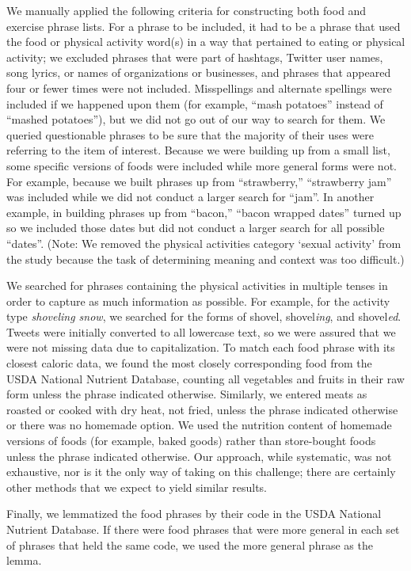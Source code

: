 \documentclass[10pt]{article}
\begin{document}
We manually applied the following criteria for constructing both food and exercise
phrase lists.
For a phrase to be included, it had to be a phrase that used the food
or physical activity word(s) in a way that pertained to eating or
physical activity; we excluded phrases that were part of hashtags,
Twitter user names, song lyrics, or names of organizations or
businesses, and phrases that appeared four or fewer times were not
included.
Misspellings and alternate spellings were included if we happened upon
them (for example, ``mash potatoes'' instead of ``mashed potatoes''),
but we did not go out of our way to search for them.
We queried questionable phrases to be sure that the majority of their
uses were referring to the item of interest.
Because we were building up from a small list, some specific versions
of foods were included while more general forms were not.  For
example, because we built phrases up from ``strawberry,'' ``strawberry
jam'' was included while we did not conduct a larger search for ``jam''.
In another example, in building phrases up from ``bacon,'' ``bacon
wrapped dates'' turned up so we included those dates but did not
conduct a larger search for all possible ``dates''.
(Note: We removed the physical activities category `sexual activity'
from the study because the task of determining meaning and context was
too difficult.)

We searched for phrases containing the physical activities in multiple
tenses in order to capture as much information as possible.
For example, for the activity type \textit{shoveling snow}, we
searched for the forms of shovel, shovel\textit{ing}, and
shovel\textit{ed}.
Tweets were initially converted to all lowercase text, so we were
assured that we were not missing data due to capitalization.
To match each food phrase with its closest caloric data, we found the
most closely corresponding food from the USDA National Nutrient
Database, counting all vegetables and fruits in their raw form unless
the phrase indicated otherwise.
Similarly, we entered meats as roasted or cooked with dry heat, not fried, unless the phrase
indicated otherwise or there was no homemade option.
We used the nutrition content of homemade versions of foods (for
example, baked goods) rather than store-bought foods unless the phrase
indicated otherwise.
Our approach, while systematic, was not exhaustive, nor is it the only
way of taking on this challenge; there are certainly other methods
that we expect to yield similar results.

Finally, we lemmatized the food phrases by their code in the USDA
National Nutrient Database.  If there were food phrases that were more
general in each set of phrases that held the same code, we used the
more general phrase as the lemma.
\end{document}
